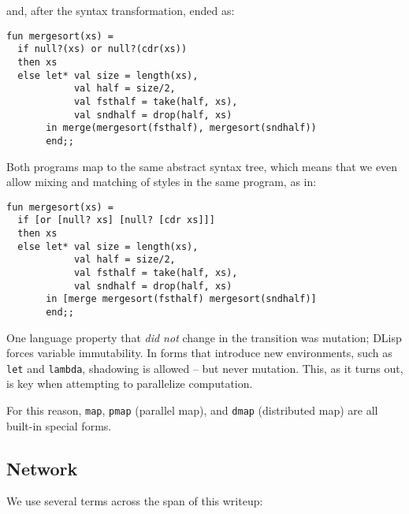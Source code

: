 \documentclass[letterpaper,twocolumn,10pt]{article}
\begin{document}
\newpage

and, after the syntax transformation, ended as:

\begin{verbatim}
fun mergesort(xs) =
  if null?(xs) or null?(cdr(xs))
  then xs
  else let* val size = length(xs),
            val half = size/2,
            val fsthalf = take(half, xs),
            val sndhalf = drop(half, xs)
       in merge(mergesort(fsthalf), mergesort(sndhalf))
       end;;
\end{verbatim}

Both programs map to the same abstract syntax tree, which means that we even
allow mixing and matching of styles in the same program, as in:

\begin{verbatim}
fun mergesort(xs) =
  if [or [null? xs] [null? [cdr xs]]]
  then xs
  else let* val size = length(xs),
            val half = size/2,
            val fsthalf = take(half, xs),
            val sndhalf = drop(half, xs)
       in [merge mergesort(fsthalf) mergesort(sndhalf)]
       end;;
\end{verbatim}

One language property that \textit{did not} change in the transition was
mutation; DLisp forces variable immutability. In forms that introduce new
environments, such as \verb|let| and \verb|lambda|, shadowing is allowed -- but
never mutation. This, as it turns out, is key when attempting to parallelize
computation.

For this reason, \verb|map|, \verb|pmap| (parallel map), and \verb|dmap|
(distributed map) are all built-in special forms.

\newpage

\subsection{Network}

We use several terms across the span of this writeup:
\end{document}
